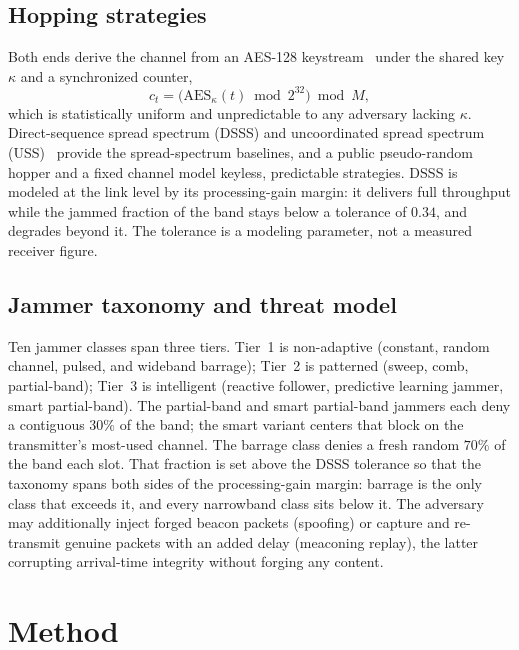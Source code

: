 \documentclass[journal]{IEEEtran}
\begin{document}
\subsection{Hopping strategies}
Both ends derive the channel from an AES-128 keystream~\cite{ref20,ref22} under
the shared key $\kappa$ and a synchronized counter,
\begin{equation}
c_t = \big(\mathrm{AES}_\kappa(t) \bmod 2^{32}\big) \bmod M ,
\label{eq:crypto}
\end{equation}
which is statistically uniform and unpredictable to any adversary lacking
$\kappa$. Direct-sequence spread spectrum (DSSS) and uncoordinated spread
spectrum (USS)~\cite{ref2} provide the spread-spectrum baselines, and a public
pseudo-random hopper and a fixed channel model keyless, predictable strategies.
DSSS is modeled at the link level by its processing-gain margin: it delivers
full throughput while the jammed fraction of the band stays below a tolerance
of $0.34$, and degrades beyond it. The tolerance is a modeling parameter, not a
measured receiver figure.

\subsection{Jammer taxonomy and threat model}
Ten jammer classes span three tiers. Tier~1 is non-adaptive (constant, random
channel, pulsed, and wideband barrage); Tier~2 is patterned (sweep, comb,
partial-band); Tier~3 is intelligent (reactive follower, predictive learning
jammer, smart partial-band). The partial-band and smart partial-band jammers
each deny a contiguous $30\%$ of the band; the smart variant centers that block
on the transmitter's most-used channel. The barrage class denies a fresh random
$70\%$ of the band each slot. That fraction is set above the DSSS tolerance so
that the taxonomy spans both sides of the processing-gain margin: barrage is
the only class that exceeds it, and every narrowband class sits below it. The adversary may additionally
inject forged beacon packets (spoofing) or capture and re-transmit genuine
packets with an added delay (meaconing replay), the latter corrupting
arrival-time integrity without forging any content.

\section{Method}\label{sec:method}
\end{document}
